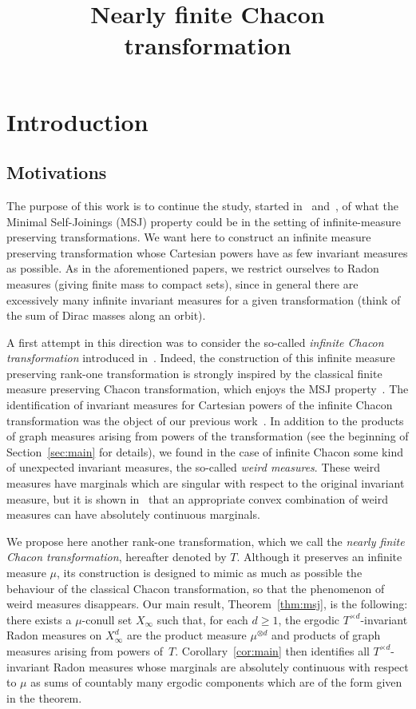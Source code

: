\documentclass[AHL,Unicode,longabstracts]{cedram}
\title[Nearly finite Chacon]{Nearly finite Chacon transformation}
\author[\initial{\'E.} \lastname{Janvresse}]{\firstname{\'Elise} \lastname{Janvresse}}
\author[\initial{E.} \lastname{Roy}]{\firstname{Emmanuel} \lastname{Roy}}
\author[\initial{T.} \lastname{de la Rue}]{\firstname{Thierry} \lastname{de la Rue}}
\newcommand{\td}{T^{\times d}}
\begin{document}
\maketitle

\section{Introduction}

\subsection{Motivations}

The purpose of this work is to continue the study, started in~\cite{ChaconInfinite} and~\cite{RadonMSJ}, of what the Minimal Self-Joinings (MSJ) property could be in the setting of infinite-measure preserving transformations. We want here to construct an infinite measure preserving transformation whose Cartesian powers have as few invariant measures as possible. As in the aforementioned papers, we restrict ourselves to Radon measures (giving finite mass to compact sets), since in general there are excessively many infinite invariant measures for a given transformation (think of the sum of Dirac masses along an orbit).

A first attempt in this direction was to consider the so-called \emph{infinite Chacon transformation} introduced in~\cite{AFS1997}. Indeed, the construction of this infinite measure preserving rank-one transformation is strongly inspired by the classical finite measure preserving Chacon transformation, which enjoys the MSJ property~\cite{DJRS1980}. The identification of invariant measures for Cartesian powers of the infinite Chacon transformation was the object of our previous work~\cite{ChaconInfinite}. In addition to the products of graph measures arising from powers of the transformation (see the beginning of Section~\ref{sec:main} for details), we found in the case of infinite Chacon some kind of unexpected invariant measures, the so-called \emph{weird measures}. These weird measures have marginals which are singular with respect to the original invariant measure, but it is shown in~\cite[Example~5.4]{RadonMSJ} that an appropriate convex combination of weird measures can have absolutely continuous marginals.

We propose here another rank-one transformation, which we call the \emph{nearly finite Chacon transformation}, hereafter denoted by $T$. Although it preserves an infinite measure $\mu$, its construction is designed to mimic as much as possible the behaviour of the classical Chacon transformation, so that the phenomenon of weird measures disappears. Our main result, Theorem~\ref{thm:msj}, is the following: there exists a $\mu$-conull set $X_\infty$ such that, for each $d\ge1$, the ergodic $\td$-invariant Radon measures on $X_{\infty}^d$ are the product measure $\mu^{\otimes d}$ and products of graph measures arising from powers of~$T$. Corollary~\ref{cor:main} then identifies all $\td$-invariant Radon measures whose marginals are absolutely continuous with respect to $\mu$ as sums of countably many ergodic components which are of the form given in the theorem.
\end{document}
